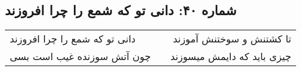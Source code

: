\begin{center}
\section*{شماره ۴۰: دانی تو که شمع را چرا افروزند}
\label{sec:040}
\begin{longtable}{l p{0.5cm} r}
دانی تو که شمع را چرا افروزند
&&
تا کشتنش و سوختنش آموزند
\\
چون آتش سوزنده غیب است بسی
&&
چیزی باید که دایمش میسوزند
\\
\end{longtable}
\end{center}
